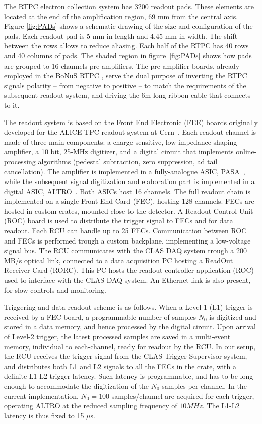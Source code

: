 \documentclass[twocolumn,showpacs,superscriptaddress,groupedaddress]{revtex4}
\begin{document}
The RTPC electron collection system has 3200 readout pads. These elements are
located at the end of the amplification region, 69 mm from the central axis.
Figure \ref{fig:PADs} shows a schematic drawing of the size and 
configuration of the pads. Each readout pad is 5 mm in length and 4.45 mm in 
width.  The shift between the rows allows to reduce aliasing. Each half of the 
RTPC has 40 rows and 40 columns of pads. The shaded region in figure~\ref{fig:PADs} 
shows how pads are grouped to 16 channels pre-amplifiers. The pre-amplifier boards, 
already employed in the BoNuS RTPC \cite{BONUS-NIM}, serve the dual purpose of 
inverting the RTPC signals polarity -- from negative to positive -- to match the 
requirements of the subsequent readout system, and driving the 6m long ribbon 
cable that connects to it.

The readout system is based on the Front End Electronic (FEE) boards originally 
developed for the ALICE TPC readout system at Cern~\cite{ALICE-FEE}. Each 
readout channel is made of three main components: a charge sensitive, low 
impedance shaping amplifier, a 10 bit, 25-MHz digitizer, and a digital circuit 
that implements online-processing algorithms (pedestal subtraction, zero 
suppression, ad tail cancellation). The amplifier is implemented in a 
fully-analogue ASIC, PASA~\cite{ALICE-PASA}, while the subsequent signal 
digitization and elaboration part is implemented in a digital ASIC, 
ALTRO~\cite{ALICE-ALTRO}. Both ASICs host 16 channels. The full readout 
chain is implemented on a single Front End Card (FEC), hosting 128 channels. 
FECs are hosted in custom crates, mounted close to the detector. A Readout 
Control Unit (ROC) board is used to distribute the trigger signal to FECs 
and for data readout. Each RCU can handle up to 25 FECs. Communication 
between ROC and FECs is performed trough a custom backplane, implementing 
a low-voltage signal bus. The RCU communicates with the CLAS DAQ system 
trough a 200 MB/s optical link, connected to a data acquisition PC hosting 
a ReadOut Receiver Card (RORC). This PC hosts the readout controller 
application (ROC) used to interface with the CLAS DAQ system. An Ethernet 
link is also present, for slow-controls and monitoring.

Triggering and data-readout scheme is as follows. When a Level-1 (L1) trigger 
is received by a FEC-board, a programmable number of samples $N_0$ is digitized 
and stored in a data memory, and hence processed by the digital circuit. Upon 
arrival of Level-2 trigger, the latest processed samples are saved in a 
multi-event memory, individual to each-channel, ready for readout by the RCU.  
In our setup, the RCU receives the trigger signal from the CLAS Trigger 
Supervisor system, and distributes both L1 and L2 signals to all the FECs in 
the crate, with a definite L1-L2 trigger latency. Such latency is programmable, 
and has to be long enough to accommodate the digitization of the $N_0$ samples 
per channel.  In the current implementation, $N_0=100$ samples/channel are 
acquired for each trigger, operating ALTRO at the reduced sampling frequency of 
$10 MHz$. The L1-L2 latency is thus fixed to 15 $\mu$s.
\end{document}

